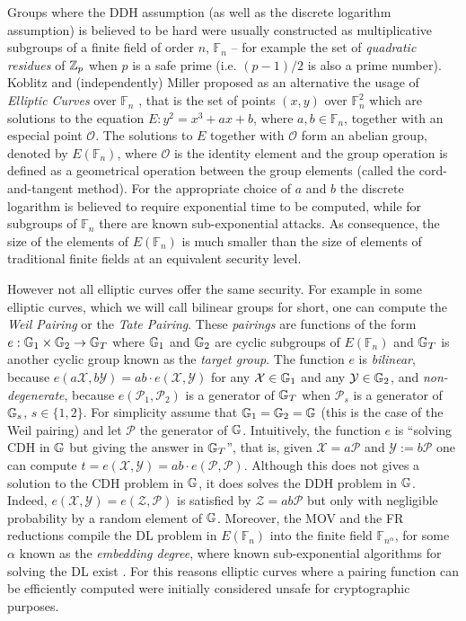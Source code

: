 Groups where the DDH assumption (as well as the discrete logarithm assumption) is believed to be hard were usually constructed as multiplicative subgroups of a finite field of order $n$, $\mathbb{F}_n$ -- for example the set of \emph{quadratic residues} of $\mathbb{Z}_p$ when $p$ is a safe prime (i.e. $(p-1)/2$ is also a prime number).
Koblitz and (independently) Miller proposed as an alternative the usage of \emph{Elliptic Curves} over $\mathbb{F}_n$ \cite{MOC:Koblitz87,C:Miller85}, that is the set of points $(x,y)$ over $\mathbb{F}_n^2$ which are solutions to the equation $E:y^2=x^3+ax+b$, where $a,b\in\mathbb{F}_n$, together with an especial point $\mathcal{O}$. The solutions to $E$ together with $\mathcal{O}$ form an abelian group, denoted by $E(\mathbb{F}_n)$, where $\mathcal{O}$ is the identity element and the group operation is defined as a geometrical operation between the group elements (called the cord-and-tangent method). For the appropriate choice of $a$ and $b$ the discrete logarithm is believed to require exponential time to be computed, while for subgroups of $\mathbb{F}_n$  there are known sub-exponential attacks. As consequence, the size of the elements of $E(\mathbb{F}_n)$ is much smaller than the size of elements of traditional finite fields at an equivalent security level.

However not all elliptic curves offer the same security. For example in some elliptic curves, which we will call bilinear groups for short, one can compute the \emph{Weil Pairing} or the \emph{Tate Pairing}. These \emph{pairings} are functions of the form $e:\mathbb{G}_1\times\mathbb{G}_2\to\mathbb{G}_T$ where $\mathbb{G}_1$ and $\mathbb{G}_2$ are cyclic subgroups of $E(\mathbb{F}_n)$ and $\mathbb{G}_T$ is another cyclic group known as the \emph{target group}. The function $e$ is \emph{bilinear}, because $e(a\mathcal{X},b\mathcal{Y})=ab\cdot e(\mathcal{X},\mathcal{Y})$ for any $\mathcal{X}\in\mathbb{G}_1$ and any $\mathcal{Y}\in\mathbb{G}_2$, and \emph{non-degenerate}, because $e(\mathcal{P}_1,\mathcal{P}_2)$ is a generator of $\mathbb{G}_T$ when $\mathcal{P}_s$ is a generator of $\mathbb{G}_s$, $s\in\{1,2\}$. For simplicity assume that $\mathbb{G}_1=\mathbb{G}_2=\mathbb{G}$ (this is the case of the Weil pairing) and let $\mathcal{P}$ the generator of $\mathbb{G}$. Intuitively, the function $e$ is ``solving CDH in $\mathbb{G}$ but giving the answer in $\mathbb{G}_T$'', that is, given $\mathcal{X}=a\mathcal{P}$ and $\mathcal{Y}:=b\mathcal{P}$ one can compute $t=e(\mathcal{X},\mathcal{Y})=ab\cdot e(\mathcal{P},\mathcal{P})$. Although this does not gives a solution to the CDH problem in $\mathbb{G}$, it does solves the DDH problem in $\mathbb{G}$. Indeed, $e(\mathcal{X},\mathcal{Y})=e(\mathcal{Z},\mathcal{P})$ is satisfied by $\mathcal{Z}=ab\mathcal{P}$ but only with negligible probability by a random element of $\mathbb{G}$. 
Moreover, the MOV and the FR reductions compile the DL problem in $E(\mathbb{F}_n)$ into the finite field $\mathbb{F}_{n^\alpha}$, for some $\alpha$ known as the \emph{embedding degree}, where known sub-exponential algorithms for solving the DL exist \cite{STOC:MenVanOka91,MOC:FreRuc94}.
For this reasons elliptic curves where a pairing function can be efficiently computed were initially considered unsafe for cryptographic purposes.

